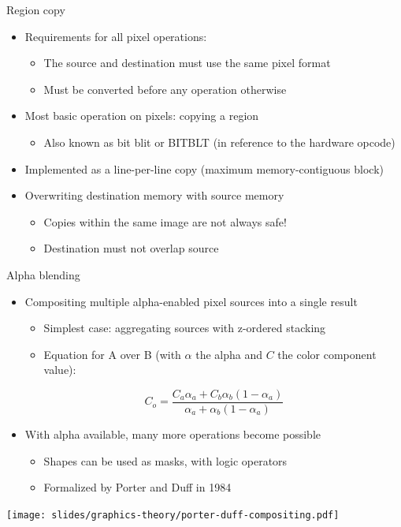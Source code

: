 \begin{frame}{Region copy}
  \begin{itemize}
  \item Requirements for all pixel operations:
    \begin{itemize}
    \item The source and destination must use the same pixel format
    \item Must be converted before any operation otherwise
    \end{itemize}
  \item Most basic operation on pixels: copying a region
    \begin{itemize}
    \item Also known as bit blit or BITBLT (in reference to the hardware opcode)
    \end{itemize}
  \item Implemented as a line-per-line copy (maximum memory-contiguous block)
  \item Overwriting destination memory with source memory
    \begin{itemize}
    \item Copies within the same image are not always safe!
    \item Destination must not overlap source
    \end{itemize}
  \end{itemize}
\end{frame}

\begin{frame}{Alpha blending}
  \begin{itemize}
  \item Compositing multiple alpha-enabled pixel sources into a single result
    \begin{itemize}
    \item Simplest case: aggregating sources with z-ordered stacking
    \item Equation for A over B (with \(\alpha\) the alpha and \(C\) the color component value):
    \end{itemize}
\[
C_o = \frac{C_a \alpha_a + C_b \alpha_b \left(1 - \alpha_a\right)}{\alpha_a + \alpha_b \left(1 - \alpha_a\right)}
\]
  \item With alpha available, many more operations become possible
    \begin{itemize}
    \item Shapes can be used as masks, with logic operators
    \item Formalized by Porter and Duff in 1984
    \end{itemize}
  \end{itemize}
  \begin{center}
  \texttt{[image: slides/graphics-theory/porter-duff-compositing.pdf]}
  \end{center}
\end{frame}

